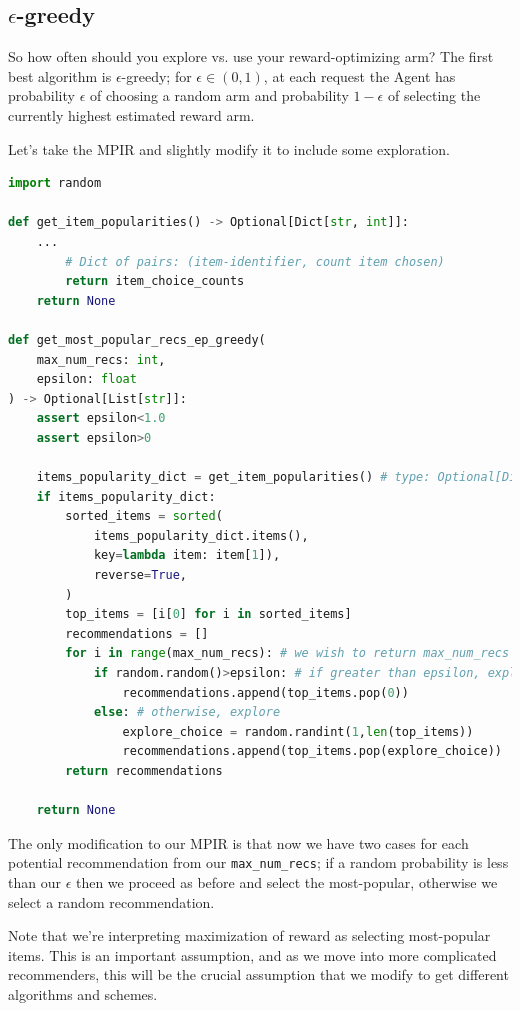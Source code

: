 \subsection{$\epsilon$-greedy}

So how often should you explore vs. use your reward-optimizing arm? The first best algorithm is $\epsilon$-greedy; for $\epsilon \in (0,1)$, at each request the Agent has probability $\epsilon$ of choosing a random arm and probability $1-\epsilon$ of selecting the currently highest estimated reward arm.

Let's take the MPIR and slightly modify it to include some exploration. 

\begin{lstlisting}[language=Python]
import random

def get_item_popularities() -> Optional[Dict[str, int]]:
    ...
        # Dict of pairs: (item-identifier, count item chosen)
        return item_choice_counts 
    return None

def get_most_popular_recs_ep_greedy(
    max_num_recs: int, 
    epsilon: float
) -> Optional[List[str]]:
    assert epsilon<1.0
    assert epsilon>0

    items_popularity_dict = get_item_popularities() # type: Optional[Dict[str, int]]
    if items_popularity_dict:
        sorted_items = sorted(
            items_popularity_dict.items(), 
            key=lambda item: item[1]),
            reverse=True,
        )
        top_items = [i[0] for i in sorted_items]
        recommendations = []
        for i in range(max_num_recs): # we wish to return max_num_recs
            if random.random()>epsilon: # if greater than epsilon, exploit
                recommendations.append(top_items.pop(0))
            else: # otherwise, explore
                explore_choice = random.randint(1,len(top_items))
                recommendations.append(top_items.pop(explore_choice))
        return recommendations
    
    return None
\end{lstlisting}

The only modification to our MPIR is that now we have two cases for each potential recommendation from our \lstinline{max_num_recs}; if a random probability is less than our $\epsilon$ then we proceed as before and select the most-popular, otherwise we select a random recommendation. 

Note that we're interpreting maximization of reward as selecting most-popular items. This is an important assumption, and as we move into more complicated recommenders, this will be the crucial assumption that we modify to get different algorithms and schemes.

